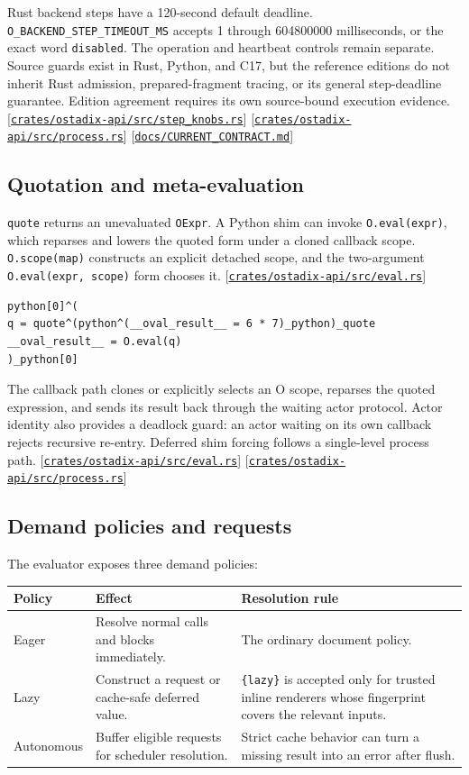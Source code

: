 \documentclass[11pt,oneside]{article}
\newcommand{\src}[1]{\textcolor{OSlate}{\scriptsize[\href{https://github.com/lostadi/OSTADIX/blob/c0b02c326b2329a95ba52447c7180bc93957cd57/#1}{\nolinkurl{#1}}]}\allowbreak}
\begin{document}
Rust backend steps have a 120-second default deadline.
\texttt{O\_BACKEND\_STEP\_TIMEOUT\_MS} accepts 1 through 604800000
milliseconds, or the exact word \texttt{disabled}. The operation and heartbeat
controls remain separate. Source guards exist in Rust, Python, and C17, but the
reference editions do not inherit Rust admission, prepared-fragment tracing,
or its general step-deadline guarantee. Edition agreement requires its own
source-bound execution evidence.
\src{crates/ostadix-api/src/step_knobs.rs}
\src{crates/ostadix-api/src/process.rs}
\src{docs/CURRENT_CONTRACT.md}

\subsection{Quotation and meta-evaluation}

\texttt{quote} returns an unevaluated \texttt{OExpr}. A Python shim can invoke
\texttt{O.eval(expr)}, which reparses and lowers the quoted form under a cloned
callback scope. \texttt{O.scope(map)} constructs an explicit detached scope,
and the two-argument \texttt{O.eval(expr, scope)} form chooses it.
\src{crates/ostadix-api/src/eval.rs}

\begin{lstlisting}[style=ostyle]
python[0]^(
q = quote^(python^(__oval_result__ = 6 * 7)_python)_quote
__oval_result__ = O.eval(q)
)_python[0]
\end{lstlisting}

The callback path clones or explicitly selects an O scope, reparses the quoted
expression, and sends its result back through the waiting actor protocol.
Actor identity also provides a deadlock guard: an actor waiting on its own
callback rejects recursive re-entry. Deferred shim forcing follows a
single-level process path. \src{crates/ostadix-api/src/eval.rs}
\src{crates/ostadix-api/src/process.rs}

\subsection{Demand policies and requests}

The evaluator exposes three demand policies:

\begin{longtable}{P{0.18\textwidth} P{0.35\textwidth} P{0.39\textwidth}}
\toprule
\textbf{Policy} & \textbf{Effect} & \textbf{Resolution rule} \\
\midrule
\endhead
Eager &
Resolve normal calls and blocks immediately. &
The ordinary document policy. \\
Lazy &
Construct a request or cache-safe deferred value. &
\texttt{\{lazy\}} is accepted only for trusted inline renderers whose
fingerprint covers the relevant inputs. \\
Autonomous &
Buffer eligible requests for scheduler resolution. &
Strict cache behavior can turn a missing result into an error after flush. \\
\bottomrule
\end{longtable}
\end{document}
